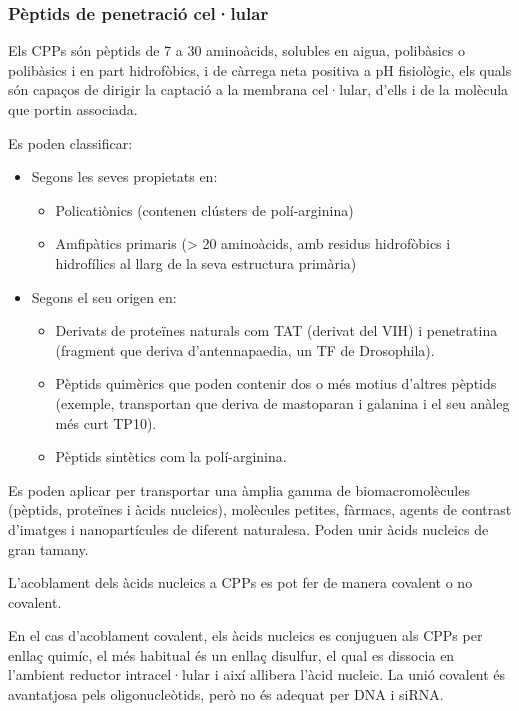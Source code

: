 \subsubsection{Pèptids de penetració cel·lular}
\label{sec:pept-de-penetr}
Els CPPs són pèptids de 7 a 30 aminoàcids, solubles en aigua, polibàsics o polibàsics i en part hidrofòbics, i de càrrega neta positiva a pH fisiològic, els quals són capaços de dirigir la captació a la membrana cel·lular, d'ells i de la molècula que portin associada.

Es poden classificar:
\begin{itemize}
\item Segons les seves propietats en:
	\begin{itemize}
	\item Policatiònics (contenen clústers de polí-arginina)
	\item Amfipàtics primaris (> 20 aminoàcids, amb residus hidrofòbics i hidrofílics al llarg de la seva
	estructura primària)
	\end{itemize}

\item Segons el seu origen en:
	\begin{itemize}
	\item Derivats de proteïnes naturals com TAT (derivat del VIH) i penetratina (fragment que deriva d'antennapaedia, un TF de Drosophila).
	\item Pèptids quimèrics que poden contenir dos o més motius d'altres pèptids (exemple, transportan que deriva de mastoparan i galanina i el seu anàleg més curt TP10).
	\item Pèptids sintètics com la polí-arginina.
	\end{itemize}
\end{itemize}

Es poden aplicar per transportar una àmplia gamma de biomacromolècules (pèptids, proteïnes i àcids nucleics), molècules petites, fàrmacs, agents de contrast d'imatges i nanopartícules de diferent naturalesa. Poden unir àcids nucleics de gran tamany.

L'acoblament dels àcids nucleics a CPPs es pot fer de manera covalent o no covalent.

En el cas d'acoblament covalent, els àcids nucleics es conjuguen als CPPs per enllaç quimíc, el més habitual és un enllaç disulfur, el qual es dissocia en l'ambient reductor intracel·lular i així allibera l'àcid nucleic. La unió covalent és avantatjosa pels oligonucleòtids, però no és adequat per DNA i siRNA.

